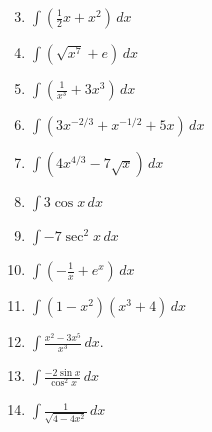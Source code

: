 \documentclass[12pt]{article}
\newif\ifans
\begin{document}
\begin{enumerate}
\setcounter{enumi}{2}

\item $\int \left(\frac{1}{2}x+x^2 \right)\,dx$ 

\ifans{\fbox{$\frac{1}{4}x^2+\frac{1}{3}x^3+C$}} \fi

\item $\int \left(\sqrt{x^7}+e\right) \,dx$

\ifans{\fbox{$\frac{2}{9}x^{9/2}+ex+C$}} \fi

\item $\int \left(\frac{1}{x^3}+3x^3\right) \,dx$ 

\ifans{\fbox{$\frac{-1}{2}x^{-2}+\frac{3}{4}x^4+C$}} \fi

\item $\int \left(3x^{-2/3}+x^{-1/2} + 5x\right) \,dx$ 

\ifans{\fbox{$9x^{1/3}+2x^{1/2}+\frac{5}{2}x^2+C$}} \fi

\item $\int \left(4x^{4/3}-7\sqrt{x}\right) \,dx$ 

\ifans{\fbox{$\frac{12}{7}x^{7/3}-\frac{14}{3}x^{3/2}+C$}} \fi

\item $\int 3\cos{x} \,dx$ 

\ifans{\fbox{$3\sin{x}+C$}} \fi

\item $\int -7\sec^{2}{x} \,dx$ 

\ifans{\fbox{$-7\tan{x}+C$}} \fi

\item $\int \left(-\frac{1}{x}+ e^{x}\right) \,dx$ 

\ifans{\fbox{$-\ln{|x|}+e^{x}+C$}} \fi

\item $\int (1-x^2)(x^3+4) \,dx$ 

\ifans{\fbox{$-\frac{1}{6}x^6+\frac{1}{4}x^4-\frac{4}{3}x^3+4x+C$}} \fi

\item $\int \frac{x^2-3x^5}{x^3} \,dx$.

\ifans{\fbox{$\ln{|x|}-x^3+C$}} \fi

\item $\int \frac{-2\sin{x}}{\cos^{2}x} \,dx$ 

\ifans{\fbox{$-2\sec{x}+C$}} \fi

\item $\int \frac{1}{\sqrt{4-4x^2}} \,dx$ 

\ifans{\fbox{$\frac{1}{2}\sin^{-1}{x}+C$}} \fi


\end{enumerate}
\end{document}
